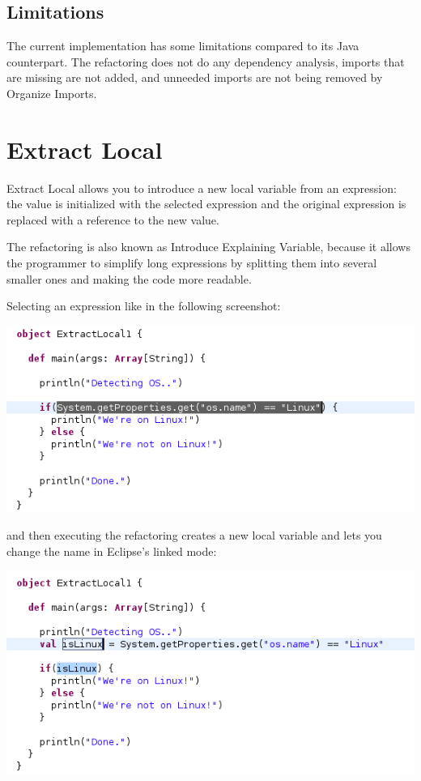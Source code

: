 \documentclass[10pt,a4paper,oneside]{scrreprt}
\begin{document}
\subsection{Limitations}

The current implementation has some limitations compared to its Java counterpart. The refactoring does not do any dependency analysis, imports that are missing are not added, and unneeded imports are not being removed by Organize Imports. 

\section{Extract Local}

Extract Local allows you to introduce a new local variable from an expression: the value is initialized with the selected expression and the original  expression is replaced with a reference to the new value. 

The refactoring is also known as Introduce Explaining Variable, because it allows the programmer to simplify long expressions by splitting them into several smaller ones and making the code more readable. 

Selecting an expression like in the following screenshot:

\begin{center}
  \includegraphics[width=0.8\linewidth]{extract_local_screenshot_2.png}
\end{center}

and then executing the refactoring creates a new local variable and lets you change the name in Eclipse's linked mode:

\begin{center}
  \includegraphics[width=0.8\linewidth]{extract_local_screenshot_3.png}
\end{center}
\end{document}
